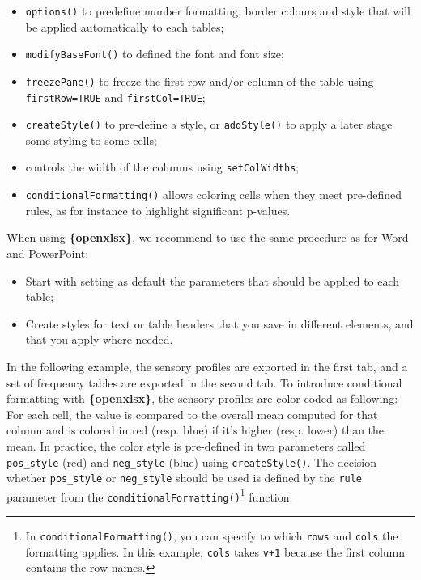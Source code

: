 \documentclass[
]{book}
\providecommand{\tightlist}{%
  \setlength{\itemsep}{0pt}\setlength{\parskip}{0pt}}
\begin{document}
\begin{itemize}
  \begin{itemize}
  \tightlist
  \item
    \texttt{options()} to predefine number formatting, border colours and style that will be applied automatically to each tables;
  \item
    \texttt{modifyBaseFont()} to defined the font and font size;
  \item
    \texttt{freezePane()} to freeze the first row and/or column of the table using \texttt{firstRow=TRUE} and \texttt{firstCol=TRUE};
  \item
    \texttt{createStyle()} to pre-define a style, or \texttt{addStyle()} to apply a later stage some styling to some cells;
  \item
    controls the width of the columns using \texttt{setColWidths};
  \item
    \texttt{conditionalFormatting()} allows coloring cells when they meet pre-defined rules, as for instance to highlight significant p-values.
  \end{itemize}
\end{itemize}

When using \textbf{\{openxlsx\}}, we recommend to use the same procedure as for Word and PowerPoint:

\begin{itemize}
\tightlist
\item
  Start with setting as default the parameters that should be applied to each table;
\item
  Create styles for text or table headers that you save in different elements, and that you apply where needed.
\end{itemize}

In the following example, the sensory profiles are exported in the first tab, and a set of frequency tables are exported in the second tab.
To introduce conditional formatting with \textbf{\{openxlsx\}}, the sensory profiles are color coded as following: For each cell, the value is compared to the overall mean computed for that column and is colored in red (resp. blue) if it's higher (resp. lower) than the mean.
In practice, the color style is pre-defined in two parameters called \texttt{pos\_style} (red) and \texttt{neg\_style} (blue) using \texttt{createStyle()}. The decision whether \texttt{pos\_style} or \texttt{neg\_style} should be used is defined by the \texttt{rule} parameter from the \texttt{conditionalFormatting()}\footnote{In \texttt{conditionalFormatting()}, you can specify to which \texttt{rows} and \texttt{cols} the formatting applies. In this example, \texttt{cols} takes \texttt{v+1} because the first column contains the row names.} function.
\end{document}
